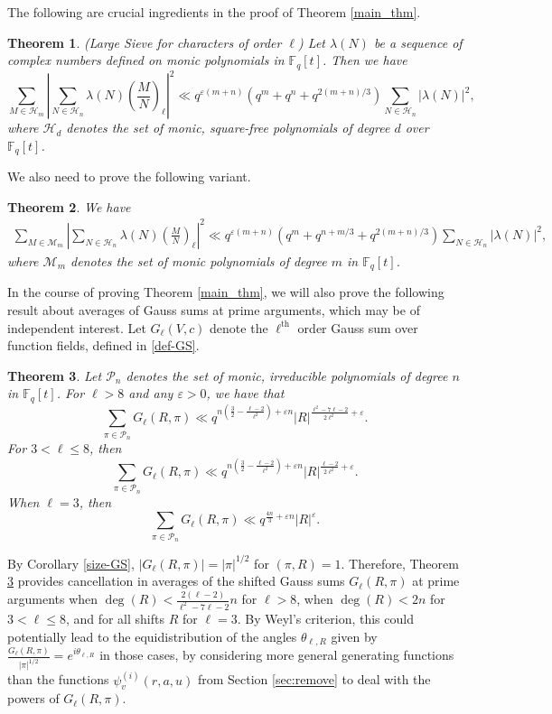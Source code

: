 \documentclass[12pt]{amsart}
\newtheorem{theorem}{Theorem}[section]
\def\cH{\mathcal{H}}
\def\cH{\mathcal{H}}
\newcommand{\legl}[2]{\left( \frac{#1}{#2} \right)_\ell}
\begin{document}
The following are crucial ingredients in the proof of Theorem \ref{main_thm}.

\begin{theorem}(Large Sieve for characters of order $\ell$)
\label{largesieve}
Let $\lambda(N)$ be a sequence of complex numbers defined on monic polynomials in $\mathbb{F}_q[t]$. Then we have 
$$
\sum_{M \in \cH_m} \left| \sum_{N \in \cH_n} \lambda(N) \legl{M}{N} \right|^2 \ll q^{\varepsilon(m+n)} \left( q^m + q^n + q^{2(m+n)/3} \right) \sum_{N \in \cH_n} |\lambda(N)|^2,
$$
where $\mathcal{H}_d$ denotes the set of monic, square-free polynomials of degree $d$ over $\mathbb{F}_q[t]$.
\end{theorem}

We also need to prove the following variant.
\begin{theorem}
\label{largesieve2}
We have
\begin{align*}
\sum_{M \in \mathcal{M}_m} \left| \sum_{N \in \mathcal{H}_n}   \lambda(N) \legl{M}{N} \right|^2 \ll q^{\varepsilon (m+n)} \left( q^m + q^{n+m/3} +  q^{2(m+n)/3} \right) \sum_{N \in \mathcal{H}_n} | \lambda(N)|^2,
\end{align*}
where $\mathcal{M}_m$ denotes the set of monic polynomials of degree $m$ in $\mathbb{F}_q[t]$.
\end{theorem}
In the course of proving Theorem \ref{main_thm}, we will also prove the following result about averages of Gauss sums at prime arguments, which may be of independent interest. Let $G_{\ell}(V,c)$ denote the $\ell^{\text{th}}$ order Gauss sum over function fields, defined in \eqref{def-GS}. 

\begin{theorem}
\label{theorem_cancellation}
Let $\mathcal{P}_n$ denotes the set of monic, irreducible polynomials of degree $n$ in $\mathbb{F}_q[t]$.
For $\ell>8$ and any $\varepsilon>0$, we have that
$$ \sum_{\pi \in \mathcal{P}_n} G_{\ell}(R,\pi) \ll q^{n (\frac{3}{2}-\frac{\ell-2}{\ell^2})+\varepsilon n} |R|^{\frac{\ell^2-7\ell-2}{2 \ell^2}+\varepsilon} .$$For $3<\ell\leq 8$, then
$$ \sum_{\pi \in \mathcal{P}_n} G_{\ell}(R,\pi) \ll q^{n (\frac{3}{2}-\frac{\ell-2}{\ell^2})+\varepsilon n} |R|^{\frac{\ell-2}{2 \ell^2}+\varepsilon} .$$
When $\ell=3$, then
$$ \sum_{\pi \in \mathcal{P}_n} G_{\ell}(R,\pi) \ll q^{\frac{4n}{3}+\varepsilon n} |R|^{\varepsilon}  .$$
\end{theorem}
By Corollary \ref{size-GS},  $|G_{\ell}(R,\pi)|= |\pi|^{1/2}$ for $(\pi, R)=1$. Therefore, Theorem \ref{theorem_cancellation} provides cancellation in averages of the shifted Gauss sums  $G_\ell(R, \pi)$ at prime arguments when $\deg(R)<\frac{2(\ell-2)}{\ell^2-7\ell-2}n$ for $\ell>8$, when
$\deg(R) <  2 n$ for $3<\ell \leq 8$, and for all shifts $R$ for $\ell = 3$. By Weyl's criterion,  this could potentially lead  to the  equidistribution of the angles $\theta_{\ell, R}$ given by
$\frac{G_{\ell}(R,\pi)}{|\pi|^{1/2}} = e^{i \theta_{\ell,R}}$ in those cases, by considering more general generating functions than the functions $\psi^{(i)}_v(r,a,u)$ from Section \ref{sec:remove} to deal with the powers of $G_{\ell}(R,\pi)$.
\end{document}
